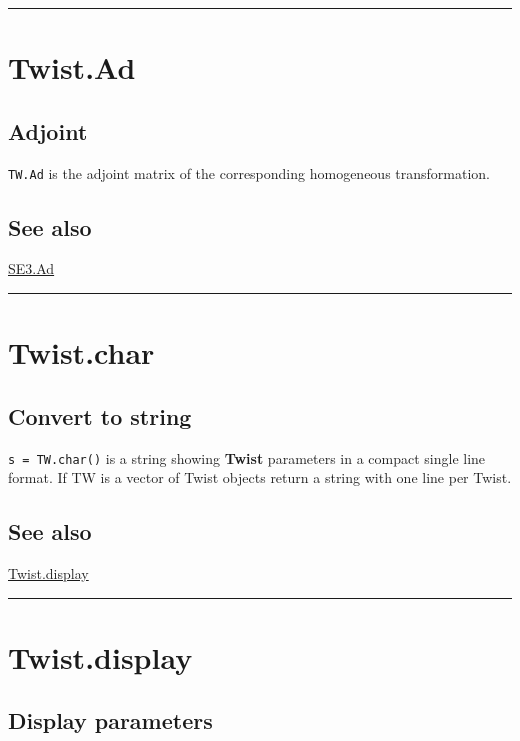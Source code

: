 \vspace{1.5ex}\hrule

\hypertarget{Twist.Ad}{\section*{Twist.Ad}}
\subsection*{Adjoint}


\texttt{TW.Ad} is the adjoint matrix of the corresponding
homogeneous transformation.


\subsection*{See also}


\hyperlink{SE3.Ad}{\color{blue} SE3.Ad}

\vspace{1.5ex}\hrule

\hypertarget{Twist.char}{\section*{Twist.char}}
\subsection*{Convert to string}


\texttt{s = TW.char()} is a string showing \textbf{\color{red} Twist} parameters in a compact single line format.
If TW is a vector of Twist objects return a string with one line per Twist.


\subsection*{See also}


\hyperlink{Twist.display}{\color{blue} Twist.display}

\vspace{1.5ex}\hrule

\hypertarget{Twist.display}{\section*{Twist.display}}
\subsection*{Display parameters}


